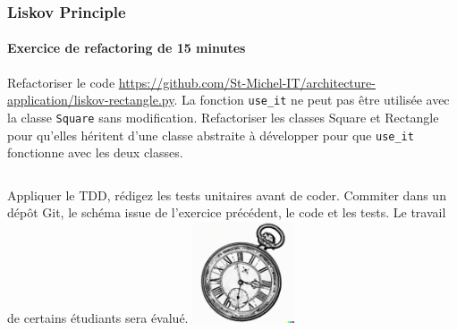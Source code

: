 \documentclass{beamer}
\begin{document}
    \begin{frame}
        \transdissolve
        \frametitle{Liskov Principle}
        \framesubtitle{Exercice \execcounterdispinc{} de refactoring de 15 minutes}
        Refactoriser le code \url{https://github.com/St-Michel-IT/architecture-application/liskov-rectangle.py}.
        La fonction \lstinline{use_it} ne peut pas être utilisée avec la classe \lstinline{Square} sans modification.
        Refactoriser les classes {Square} et {Rectangle} pour qu'elles héritent d'une classe abstraite à développer pour que \lstinline{use_it} fonctionne avec les deux classes.
        \bigbreak
        \begin{columns}
            Appliquer le TDD, rédigez les tests unitaires avant de coder.
            \bigbreak
            Commiter dans un dépôt Git, le schéma issue de l'exercice précédent, le code et les tests.
            \bigbreak
            Le travail de certains étudiants sera évalué.
            \centering
            \includegraphics[width=3cm]{image/engraving-of-an-old-watch}
        \end{columns}
    \end{frame}
\end{document}
